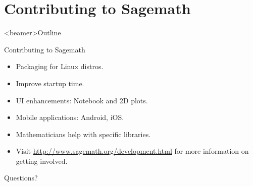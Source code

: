 \documentclass{beamer}
\begin{document}
\section{Contributing to Sagemath}
\begin{frame}<beamer>{Outline}
    \tableofcontents[currentsection, sectionstyle=show/shaded]
\end{frame}

\begin{frame}{Contributing to Sagemath}
 \begin{itemize}
  \item Packaging for Linux distros.
  \item Improve startup time.
  \item UI enhancements: Notebook and 2D plots.
  \item Mobile applications: Android, iOS.
  \item Mathematicians help with specific libraries.
  \item Visit \href{http://www.sagemath.org/development.html}{http://www.sagemath.org/development.html} for more information on getting involved.
 \end{itemize}
\end{frame}

\begin{frame}
  \begin{center}
    \HUGE Questions?
  \end{center}
\end{frame}
\end{document}
